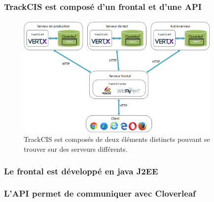 		\subsubsection{TrackCIS est composé d'un frontal et d'une API}
			\paragraph{}%
			
			\begin{figure}[H]%
				\centering
				\includegraphics[width=10cm]{../img/part3/archi_trackcis.png}
				\caption{\label{archi_trackcis} TrackCIS est composés de deux éléments
				distincts pouvant se trouver sur des serveurs différents.}
			\end{figure}
			
		\subsubsection{Le frontal est développé en java J2EE}
			\paragraph{}%
			
			\paragraph{}%
			
		\subsubsection{L'API permet de communiquer avec Cloverleaf}
			\paragraph{}%
	

